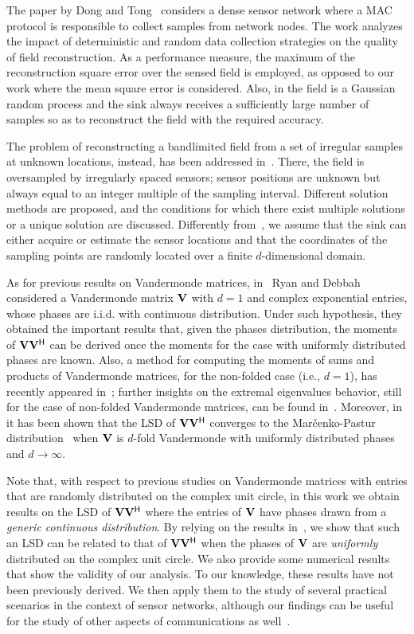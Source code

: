 \documentclass[11pt, draftcls, onecolumn, a4paper]{IEEEtran}
\newcommand{\Vm}{{\bf V}}
\def\Herm{\mathsf{^H}}
\begin{document}
The paper by Dong and Tong~\cite{DongTong} considers a dense sensor
network where a MAC protocol is responsible to collect samples from
network nodes.  The work analyzes the impact of deterministic and
random data collection strategies on the quality of field
reconstruction.  As a performance measure, the maximum of the
reconstruction square error over the sensed field is employed, as
opposed to our work where the mean square error is considered. Also,
in \cite{DongTong} the field is a Gaussian random process and 
the sink always receives a sufficiently large number of samples
so as to reconstruct the field with the required accuracy.

The problem of reconstructing a bandlimited field from a 
set of irregular samples at unknown locations, instead, has been addressed
in~\cite{Marziliano00}. There, the field is oversampled by
irregularly spaced sensors; sensor positions are unknown but always
equal to an integer multiple of the sampling interval. Different
solution methods are proposed, and the conditions for which there
exist multiple solutions or a unique solution are discussed.
Differently from~\cite{Marziliano00}, we assume that the sink can
either acquire or estimate the sensor locations and that the
coordinates of the sampling points are randomly located over a finite
$d$-dimensional domain.

As for previous results on Vandermonde matrices, in~\cite{RyanDebbah}
Ryan and Debbah considered a Vandermonde matrix $\Vm$ with $d=1$ and
complex exponential entries, whose phases are i.i.d. with continuous
distribution. Under such hypothesis, they obtained the important
results that, given the phases distribution, the moments of
$\Vm\Vm\Herm$ can be derived once the moments for the case with
uniformly distributed phases are known.  Also, a method for computing
the moments of sums and products of Vandermonde matrices, for the
non-folded case (i.e., $d=1$), has recently appeared
in~\cite{ryan-2009}; further insights on the extremal eigenvalues
behavior, still for the case of non-folded Vandermonde matrices, can
be found in~\cite{Tucci2010}. Moreover, in~\cite{TSP2} it has been
shown that the LSD of $\Vm\Vm\Herm$ converges to the
Mar\v{c}enko-Pastur distribution~\cite{MarcenkoPastur} when $\Vm$ is
$d$-fold Vandermonde with uniformly distributed phases and
$d\rightarrow\infty$.

Note that, with respect to previous studies on Vandermonde matrices with entries
that are randomly distributed on the complex unit circle, 
in this work we obtain results on
the LSD of $\Vm\Vm\Herm$ where the entries of $\Vm$ have phases drawn
from a {\em generic continuous distribution}. By relying on the
results in~\cite{TSP2,RyanDebbah}, we show that such an LSD can be related
to that of $\Vm\Vm\Herm$ when the phases of $\Vm$ are {\em uniformly}
distributed on the complex unit circle.  We also provide some
numerical results that show the validity of our analysis.  
To our knowledge, these results have not been previously derived.
We then apply them to the study of several practical scenarios in the 
context of sensor networks, 
although our findings can be useful for the study of other aspects 
of communications as well~\cite{RyanDebbah}.
\end{document}

